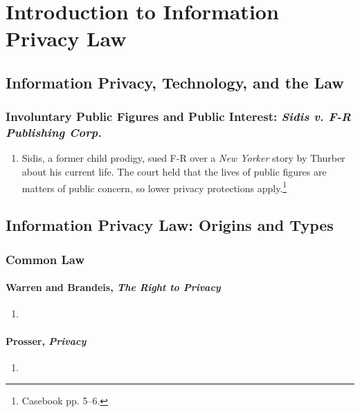 \section{Introduction to Information Privacy Law}

\subsection{Information Privacy, Technology, and the Law}

\subsubsection{Involuntary Public Figures and Public Interest: \emph{Sidis v. 
F-R Publishing Corp.}}

\begin{enumerate}
    \item Sidis, a former child prodigy, sued F-R over a \emph{New Yorker} 
    story by Thurber about his current life. The court held that the lives of 
    public figures are matters of public concern, so lower privacy protections 
    apply.\footnote{Casebook pp. 5--6.}
\end{enumerate}

\subsection{Information Privacy Law: Origins and Types}

\subsubsection{Common Law}

\paragraph{Warren and Brandeis, \emph{The Right to Privacy}}

\begin{enumerate}
    \item %
\end{enumerate}

\paragraph{Prosser, \emph{Privacy}}

\begin{enumerate}
    \item %
\end{enumerate}

